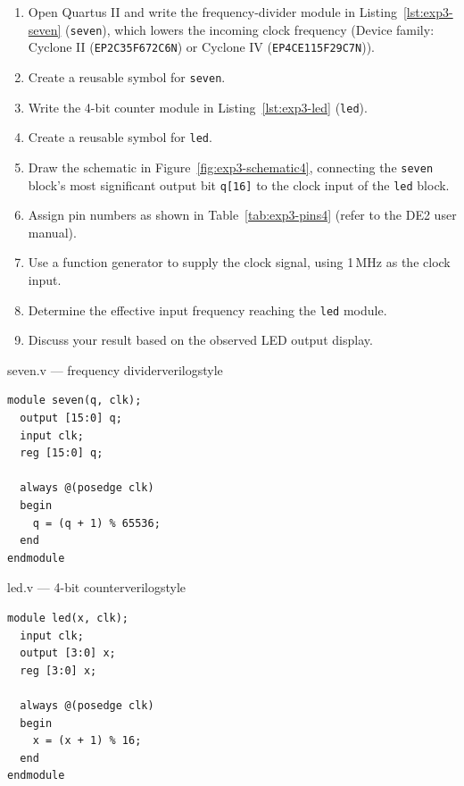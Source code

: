\begin{procedure}
  \begin{enumerate}
    \item Open Quartus II and write the frequency-divider module in Listing~\ref{lst:exp3-seven} (\texttt{seven}), which lowers the incoming clock frequency (Device family: Cyclone II (\texttt{EP2C35F672C6N}) or Cyclone IV (\texttt{EP4CE115F29C7N})).
    \item Create a reusable symbol for \texttt{seven}.
    \item Write the 4-bit counter module in Listing~\ref{lst:exp3-led} (\texttt{led}).
    \item Create a reusable symbol for \texttt{led}.
    \item Draw the schematic in Figure~\ref{fig:exp3-schematic4}, connecting the \texttt{seven} block's most significant output bit \texttt{q[16]} to the clock input of the \texttt{led} block.
    \item Assign pin numbers as shown in Table~\ref{tab:exp3-pins4} (refer to the DE2 user manual).
    \item Use a function generator to supply the clock signal, using 1\,MHz as the clock input.
    \item Determine the effective input frequency reaching the \texttt{led} module.
    \item Discuss your result based on the observed LED output display.
  \end{enumerate}

  \begin{codepanel}{seven.v --- frequency divider}{verilogstyle}
    \begin{lstlisting}
module seven(q, clk);
  output [15:0] q;
  input clk;
  reg [15:0] q;

  always @(posedge clk)
  begin
    q = (q + 1) % 65536;
  end
endmodule
\end{lstlisting}
  \end{codepanel}
  \vspace{-4pt}

  \begin{codepanel}{led.v --- 4-bit counter}{verilogstyle}
    \begin{lstlisting}
module led(x, clk);
  input clk;
  output [3:0] x;
  reg [3:0] x;

  always @(posedge clk)
  begin
    x = (x + 1) % 16;
  end
endmodule
\end{lstlisting}
  \end{codepanel}
  \vspace{-4pt}


\end{procedure}
